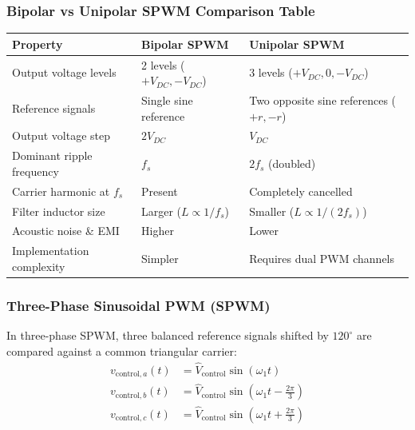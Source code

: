 \subsubsection{Bipolar vs Unipolar SPWM Comparison Table}
\begin{center}
\small
\renewcommand{\arraystretch}{1.2}
\begin{tabular}{@{}lll@{}}
\toprule
\textbf{Property} & \textbf{Bipolar SPWM} & \textbf{Unipolar SPWM} \\
\midrule
Output voltage levels & 2 levels ($+V_{DC}, -V_{DC}$) & 3 levels ($+V_{DC}, 0, -V_{DC}$) \\
Reference signals & Single sine reference & Two opposite sine references ($+r, -r$) \\
Output voltage step & $2 V_{DC}$ & $V_{DC}$ \\
Dominant ripple frequency & $f_s$ & $2 f_s$ (doubled) \\
Carrier harmonic at $f_s$ & Present & Completely cancelled \\
Filter inductor size & Larger ($L \propto 1/f_s$) & Smaller ($L \propto 1/(2f_s)$) \\
Acoustic noise \& EMI & Higher & Lower \\
Implementation complexity & Simpler & Requires dual PWM channels \\
\bottomrule
\end{tabular}
\end{center}

\subsubsection{Three-Phase Sinusoidal PWM (SPWM)}
In three-phase SPWM, three balanced reference signals shifted by $120^\circ$ are compared against a common triangular carrier:
\begin{align}
v_{\mathrm{control},a}(t) &= \hat{V}_{\mathrm{control}} \sin(\omega_1 t) \\
v_{\mathrm{control},b}(t) &= \hat{V}_{\mathrm{control}} \sin\left(\omega_1 t - \frac{2\pi}{3}\right) \\
v_{\mathrm{control},c}(t) &= \hat{V}_{\mathrm{control}} \sin\left(\omega_1 t + \frac{2\pi}{3}\right)
\end{align}

